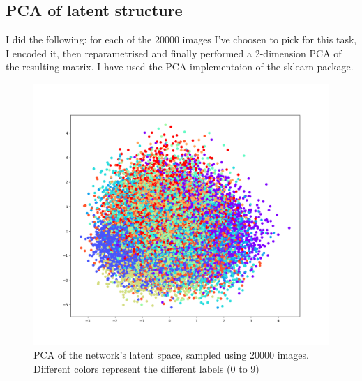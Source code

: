 \documentclass{article}
\begin{document}
\subsection{PCA of latent structure}
I did the following: for each of the 20000 images I've choosen to pick for this task, I encoded it, then reparametrised and finally performed a 2-dimension PCA of the resulting matrix. I have used the PCA implementaion of the sklearn package.
\begin{figure}[H]
  \begin{center}
    \includegraphics[width=\linewidth]{imgs/pca_latent_space.png}
    \caption{PCA of the network's latent space, sampled using 20000 images. Different colors represent the different labels (0 to 9)}\label{pca}
  \end{center}
\end{figure}
\end{document}
